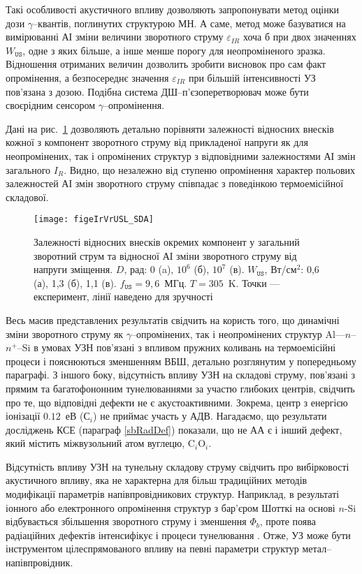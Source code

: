 Такі особливості акустичного впливу дозволяють запропонувати метод оцінки дози $\gamma$--квантів, поглинутих структурою МН.
А саме, метод може базуватися на вимірюванні АІ зміни величини зворотного струму $\varepsilon_{IR}$ хоча б при двох значеннях $W_\mathtt{US}$,
одне з яких більше, а інше менше порогу для неопроміненого зразка.
Відношення отриманих величин дозволить зробити висновок про сам факт опромінення,
а безпосереднє значення $\varepsilon_{IR}$ при більшій інтенсивності УЗ пов’язана з дозою.
Подібна система ДШ--п’єзоперетворювач може бути своєрідним сенсором $\gamma$--опромінення.

Дані на рис.~\ref{figeIrVrUSL_SDA} дозволяють детально порівняти залежності відносних внесків кожної з компонент зворотного струму від прикладеної напруги
як для неопромінених, так і опромінених структур з відповідними залежностями АІ змін загального $I_R$.
Видно, що незалежно від ступеню опромінення характер польових залежностей АІ змін зворотного струму співпадає з поведінкою термоемісійної складової.


\begin{figure}
\center
\texttt{[image: figeIrVrUSL\_SDA]}
\caption{\label{figeIrVrUSL_SDA}
Залежності відносних внесків окремих компонент у загальний зворотний струм
та відносної АІ зміни зворотного струму від напруги зміщення.
$D$, рад: 0 (a), $10^6$ (б), $10^7$ (в).
$W_\mathtt{US}$, Вт/см$^2$: 0,6 (а), 1,3 (б), 1,1 (в).
$f_\mathtt{US}=9,6$~МГц.
$T=305$~K.
Точки --- експеримент,
лінії наведено для зручності
}%
\end{figure}


Весь масив представлених результатів свідчить на користь того, що
динамічні зміни зворотного струму як $\gamma$--опромінених, так і неопромінених структур Al---$n$--$n^+$--Si в умовах УЗН
пов’язані з впливом пружних коливань на термоемісійні процеси і пояснюються зменшенням ВБШ, детально розглянутим у попередньому параграфі.
З іншого боку, відсутність впливу УЗН на складові струму, пов’язані з прямим та багатофононним тунелюваннями за участю глибоких центрів,
свідчить про те, що відповідні дефекти не є акустоактивними.
Зокрема, центр з енергією іонізації $0.12$~еВ (С$_i$) не приймає участь у АДВ.
Нагадаємо, що результати досліджень КСЕ (параграф \ref{sbRadDef}) показали, що не АА є і інший дефект, який містить міжвузольний атом вуглецю, C$_i$O$_i$.

Відсутність впливу УЗН на тунельну складову струму свідчить про вибірковості акустичного впливу, яка не характерна для більш традиційних методів модифікації параметрів напівпровідникових структур.
Наприклад, в результаті іонного або електронного опромінення структур з бар'єром Шотткі на основі $n$-Si відбувається збільшення зворотного струму
і зменшення $\Phi_b$,
проте поява радіаційних дефектів інтенсифікує і процеси тунелювання \cite{Kumar2,Rao,SINGH2001}.
Отже, УЗ може бути інструментом цілеспрямованого впливу на певні параметри структур метал--напівпровідник.


